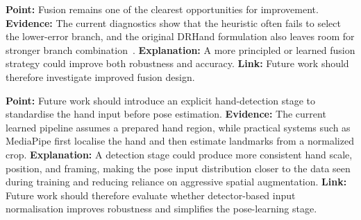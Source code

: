 \documentclass[10pt,letterpaper]{article}
\begin{document}
\medskip
\noindent\textbf{Point:} Fusion remains one of the clearest opportunities for improvement.
\textbf{Evidence:} The current diagnostics show that the heuristic often fails to select the lower-error branch, and the original DRHand formulation also leaves room for stronger branch combination~\cite{dualreg}.
\textbf{Explanation:} A more principled or learned fusion strategy could improve both robustness and accuracy.
\textbf{Link:} Future work should therefore investigate improved fusion design.

\medskip
\noindent\textbf{Point:} Future work should introduce an explicit hand-detection stage to standardise the hand input before pose estimation.
\textbf{Evidence:} The current learned pipeline assumes a prepared hand region, while practical systems such as MediaPipe first localise the hand and then estimate landmarks from a normalized crop.
\textbf{Explanation:} A detection stage could produce more consistent hand scale, position, and framing, making the pose input distribution closer to the data seen during training and reducing reliance on aggressive spatial augmentation.
\textbf{Link:} Future work should therefore evaluate whether detector-based input normalisation improves robustness and simplifies the pose-learning stage.
\end{document}

